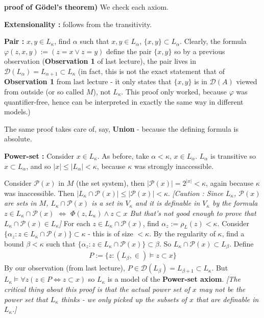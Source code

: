 \documentclass[12pt,a4paper]{article}
\newenvironment{proof}
{\begin{changemargin}{0.5cm}{0.5cm} 
	}%
	{\end{changemargin}
}
\newenvironment{p}
{\begin{proof} 
	}%
	{\end{proof}
}
\begin{document}
\begin{p}
\textbf{proof of G\"odel's theorem)} We check each axiom.

\quad \textbf{Extensionality :} follows from the transitivity. 

\quad \textbf{Pair :} $x,y\in L_{\kappa}$, find $\alpha$ such that $x, y\in L_{\alpha}$, $\{x,y\}\subset L_{\alpha}$. Clearly, the formula $\varphi(z, x,y) := (z=x\vee z=y)$ define the pair $\{x,y\}$ so by a previous observation (\textbf{Observation 1} of last lecture), the pair lives in $\mathscr{D}(L_{\alpha})=L_{\alpha+1} \subset L_{\kappa}$ (in fact, this is not the exact statement that of \textbf{Observation 1} from last lecture - it only states that $\{x,y\}$ is in $\mathscr{D}(A)$ viewed from outside (or so called $M$), not $L_{\kappa}$. This proof only worked, because $\varphi$ was quantifier-free, hence can be interpreted in exactly the same way in different models.)

\quad The same proof takes care of, say, \textbf{Union} - because the defining formula is absolute.

\quad \textbf{Power-set :} Consider $x\in L_{\kappa}$. As before, take $\alpha < \kappa$, $x\in L_{\alpha}$. $L_{\alpha}$ is transitive so $x\subset L_{\alpha}$, and so $|x|\leq |L_{\alpha}| < \kappa$, because $\kappa$ was strongly inaccessible.

\quad Consider $\mathscr{P}(x)$ in $M$ (the set system), then $|\mathscr{P}(x)| =2^{|x|} < \kappa$, again because $\kappa$ was inaccessible. Then $|L_{\kappa} \cap \mathscr{P}(x)| \leq |\mathscr{P}(x)| < \kappa$. \emph{[Caution : Since $L_{\kappa}$, $\mathscr{P}(x)$ are sets in $M$, $L_{\kappa} \cap \mathscr{P}(x)$ is a set in $V_{\kappa}$ and it is definable in $V_{\kappa}$ by the formula $z\in L_{\kappa}\cap \mathscr{P}(x)$ $\Leftrightarrow$ $\Phi(z, L_{\kappa})\wedge z\subset x$ But that's not good enough to prove that $L_{\kappa} \cap \mathscr{P}(x) \in L_{\kappa}$]} For each $z\in L_{\kappa} \cap \mathscr{P}(x)$, find $\alpha_z := \rho_L(z) < \kappa$. Consider $\{\alpha_z : z\in L_{\kappa}\cap \mathscr{P}(x) \} \subset \kappa$ - this is of size $<\kappa$. By the regularity of $\kappa$, find a bound $\beta < \kappa$ such that $\{ \alpha_z : z\in L_{\kappa} \cap \mathscr{P}(x) \} \subset \beta$. So $L_{\kappa} \cap \mathscr{P}(x) \subset L_{\beta}$. Define
\begin{align*}
P:= \{z: (L_{\beta}, \in) \models z\subset x\}
\end{align*}
By our observation (from last lecture), $P\in \mathscr{D}(L_{\beta}) = L_{\beta+1} \subset L_{\kappa}$. But $L_{\kappa} \models \forall z(z\in P \Leftrightarrow z\subset x)$ so $L_{\kappa}$ is a model of the \textbf{Power-set axiom}. \emph{[The critical thing about this proof is that the actual power set of $x$ may not be the power set that $L_{\kappa}$ thinks - we only picked up the subsets of $x$ that are definable in $L_{\kappa}$.]}
\end{p}
\s
\end{document}
